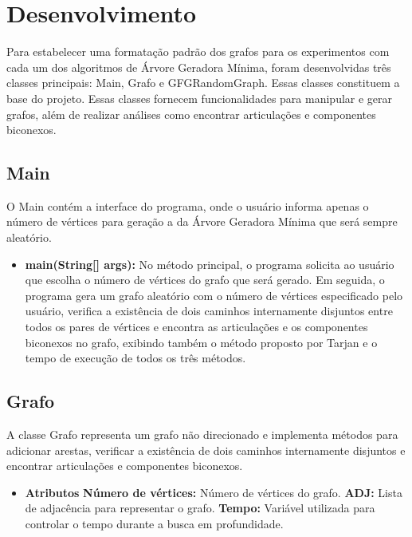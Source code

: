 \section{\esp Desenvolvimento}

Para estabelecer uma formatação padrão dos grafos para os experimentos com cada um dos algoritmos de Árvore Geradora Mínima, foram desenvolvidas três classes principais: Main, Grafo e GFGRandomGraph. Essas classes constituem a base do projeto. Essas classes fornecem funcionalidades para manipular e gerar grafos, além de realizar análises como encontrar articulações e componentes biconexos.

\subsection{\esp Main}

O Main contém a interface do programa, onde o usuário informa apenas o número de vértices para geração a da Árvore Geradora Mínima que será sempre aleatório.

\begin{itemize}
    \item \textbf{main(String[] args):} No método principal, o programa solicita ao usuário que escolha o número de vértices do grafo que será gerado. Em seguida, o programa gera um grafo aleatório com o número de vértices especificado pelo usuário, verifica a existência de dois caminhos internamente disjuntos entre todos os pares de vértices e encontra as articulações e os componentes biconexos no grafo, exibindo também o método proposto por Tarjan e o tempo de execução de todos os três métodos.
\end{itemize}  

\subsection{\esp Grafo}
A classe Grafo representa um grafo não direcionado e implementa métodos para adicionar arestas, verificar a existência de dois caminhos internamente disjuntos e encontrar articulações e componentes biconexos.

\begin{itemize}
    \item \textbf{Atributos} 
    \subitem \textbf{Número de vértices:} Número de vértices do grafo.
    \subitem \textbf{ADJ:} Lista de adjacência para representar o grafo. 
    \subitem \textbf{Tempo: }Variável utilizada para controlar o tempo durante a busca em profundidade.
\end{itemize}  

